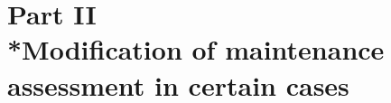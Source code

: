 \documentclass[12pt,a4paper]{article}
\begin{document}
%
%
%
%
%
%
%
%

\section[Part II --- Modification of maintenance assessment in certain cases]{Part II\\*Modification of maintenance assessment in certain cases}
\end{document}

